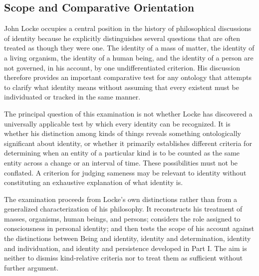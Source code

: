 
\subsection*{Scope and Comparative Orientation}

\label{para:VS.B01.P01.C08.S08.SS01.P001}

John Locke occupies a central position in the history of
philosophical discussions of identity because he explicitly
distinguishes several questions that are often treated as
though they were one. The identity of a mass of matter, the
identity of a living organism, the identity of a human being,
and the identity of a person are not governed, in his account,
by one undifferentiated criterion. His discussion therefore
provides an important comparative test for any ontology that
attempts to clarify what identity means without assuming that
every existent must be individuated or tracked in the same
manner. \cite[II.xxvii]{LockeEssay}

\label{para:VS.B01.P01.C08.S08.SS01.P002}

The principal question of this examination is not whether
Locke has discovered a universally applicable test by which
every identity can be recognized. It is whether his
distinction among kinds of things reveals something
ontologically significant about identity, or whether it
primarily establishes different criteria for determining
when an entity of a particular kind is to be counted as the
same entity across a change or an interval of time. These
possibilities must not be conflated. A criterion for judging
sameness may be relevant to identity without constituting
an exhaustive explanation of what identity is.

\label{para:VS.B01.P01.C08.S08.SS01.P003}

The examination proceeds from Locke's own distinctions
rather than from a generalized characterization of his
philosophy. It reconstructs his treatment of masses,
organisms, human beings, and persons; considers the role
assigned to consciousness in personal identity; and then
tests the scope of his account against the distinctions
between Being and identity, identity and determination,
identity and individuation, and identity and persistence
developed in Part I. The aim is neither to dismiss
kind-relative criteria nor to treat them as sufficient
without further argument.


